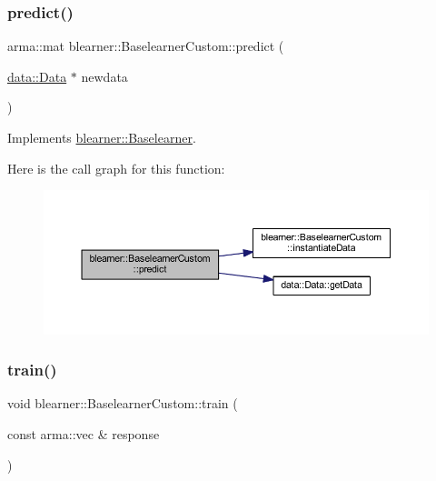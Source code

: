 \subsubsection{\texorpdfstring{predict()}{predict()}\hspace{0.1cm}{\footnotesize\ttfamily [2/2]}}
{\footnotesize\ttfamily arma\+::mat blearner\+::\+Baselearner\+Custom\+::predict (\begin{DoxyParamCaption}\item[{\mbox{\hyperlink{classdata_1_1_data}{data\+::\+Data}} $\ast$}]{newdata }\end{DoxyParamCaption})\hspace{0.3cm}{\ttfamily [virtual]}}



Implements \mbox{\hyperlink{classblearner_1_1_baselearner_ae2ef5e018783578e02b3b5a33fa94eae}{blearner\+::\+Baselearner}}.

Here is the call graph for this function\+:\nopagebreak
\begin{figure}[H]
\begin{center}
\leavevmode
\includegraphics[width=350pt]{classblearner_1_1_baselearner_custom_aeeb3a3934b94f095bfe689cff385dfa7_cgraph}
\end{center}
\end{figure}
\mbox{\label{classblearner_1_1_baselearner_custom_a31e3921f86f267d36135d07bf1d16551}} 
\subsubsection{\texorpdfstring{train()}{train()}}
{\footnotesize\ttfamily void blearner\+::\+Baselearner\+Custom\+::train (\begin{DoxyParamCaption}\item[{const arma\+::vec \&}]{response }\end{DoxyParamCaption})\hspace{0.3cm}{\ttfamily [virtual]}}




